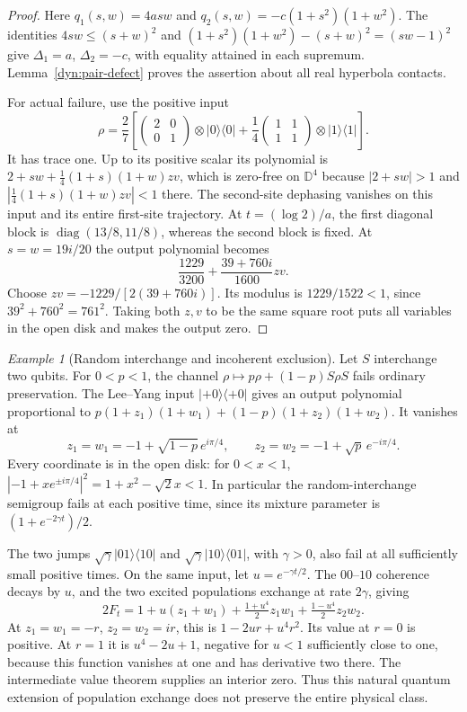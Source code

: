 \documentclass[reqno]{amsart}
\theoremstyle{definition}
\theoremstyle{remark}
\newtheorem{example}[theorem]{Example}
\newcommand{\D}{\mathbb D}
\DeclareMathOperator{\diag}{diag}
\begin{document}
\begin{proof}
Here $q_1(s,w)=4asw$ and
$q_2(s,w)=-c(1+s^2)(1+w^2)$.  The identities
$4sw\le(s+w)^2$ and
$(1+s^2)(1+w^2)-(s+w)^2=(sw-1)^2$ give
$\Delta_1=a$, $\Delta_2=-c$, with equality attained in each supremum.
Lemma~\ref{dyn:pair-defect} proves the assertion about all real
hyperbola contacts.

For actual failure, use the positive input
\[
 \rho=\frac27\left[
 \begin{pmatrix}2&0\\0&1\end{pmatrix}\otimes|0\rangle\langle0|
 +\frac14\begin{pmatrix}1&1\\1&1\end{pmatrix}\otimes|1\rangle\langle1|
 \right].
\]
It has trace one.  Up to its positive scalar its polynomial is
$2+sw+\tfrac14(1+s)(1+w)zv$, which is zero-free on $\D^4$ because
$|2+sw|>1$ and $|\tfrac14(1+s)(1+w)zv|<1$ there.
The second-site dephasing vanishes on this input and its entire
first-site trajectory.  At $t=(\log2)/a$, the first diagonal block is
$\diag(13/8,11/8)$, whereas the second block is fixed.  At $s=w=19i/20$
the output polynomial becomes
\[
 \frac{1229}{3200}+\frac{39+760i}{1600}zv.
\]
Choose $zv=-1229/[2(39+760i)]$.  Its modulus is $1229/1522<1$, since
$39^2+760^2=761^2$.  Taking both $z,v$ to be the same square root puts
all variables in the open disk and makes the output zero.
\end{proof}

\begin{example}[Random interchange and incoherent exclusion]\label{dyn:exchange-examples}
Let $S$ interchange two qubits.  For $0<p<1$, the channel
$\rho\mapsto p\rho+(1-p)S\rho S$ fails ordinary preservation.
The Lee--Yang input $|+0\rangle\langle+0|$ gives an output polynomial
proportional to
$p(1+z_1)(1+w_1)+(1-p)(1+z_2)(1+w_2)$.
It vanishes at
\[
 z_1=w_1=-1+\sqrt{1-p}\,e^{i\pi/4},\qquad
 z_2=w_2=-1+\sqrt p\,e^{-i\pi/4}.
\]
Every coordinate is in the open disk: for $0<x<1$,
$|-1+xe^{\pm i\pi/4}|^2=1+x^2-\sqrt2x<1$.
In particular the random-interchange semigroup fails at each positive
time, since its mixture parameter is $(1+e^{-2\gamma t})/2$.

The two jumps $\sqrt\gamma|01\rangle\langle10|$ and
$\sqrt\gamma|10\rangle\langle01|$, with $\gamma>0$, also fail at all
sufficiently small positive times.  On the same input, let
$u=e^{-\gamma t/2}$.  The $00$--$10$ coherence decays by $u$, and the two
excited populations exchange at rate $2\gamma$, giving
\[
 2F_t=1+u(z_1+w_1)+\tfrac{1+u^4}{2}z_1w_1
                         +\tfrac{1-u^4}{2}z_2w_2.
\]
At $z_1=w_1=-r$, $z_2=w_2=ir$, this is $1-2ur+u^4r^2$.
Its value at $r=0$ is positive.  At $r=1$ it is $u^4-2u+1$, negative
for $u<1$ sufficiently close to one, because this function vanishes at
one and has derivative two there.  The intermediate value theorem
supplies an interior zero.  Thus this natural quantum extension of
population exchange does not preserve the entire physical class.
\end{example}
\end{document}
